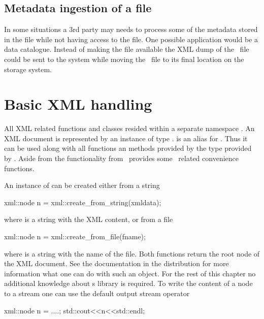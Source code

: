 \subsection{Metadata ingestion of a file}

In some situations a $3$rd party may needs to process some of the metadata 
stored in the file while not having access to the file. One possible application
would be a data catalogue. Instead of making the file available the XML dump 
of the \nexus\ file could be sent to the system while moving the \nexus\ file 
to its final location on the storage system.

\section{Basic XML handling}{\label{sec:xml:basic}

All XML related functions and classes resided within a separate namespace 
. An XML document is represented by an instance of 
type .  is an alias for . 
Thus it can be used along with all functions an methods provided by the 
 type provided by . Aside from the 
functionality from  \libpniio\ provides some 
\nexus\ related convenience functions. 

An instance of  can be created either from a string
\begin{cppcode}
    xml::node n = xml::create_from_string(xmldata);
\end{cppcode}
where  is a string with the XML content, 
or from a file
\begin{cppcode}
    xml::node n = xml::create_from_file(fname);
\end{cppcode}
where  is a string with the name of the file. Both functions 
return the root node of the XML document. See the 
documentation in the  distribution for more information what one can
do with such an object. For the rest of this chapter no additional knowledge
about s  library is required.
To write the content of a node to a stream one can use the default 
output stream operator
\begin{cppcode}
    xml::node n = ....;
    std::cout<<n<<std::endl;
\end{cppcode}


}
